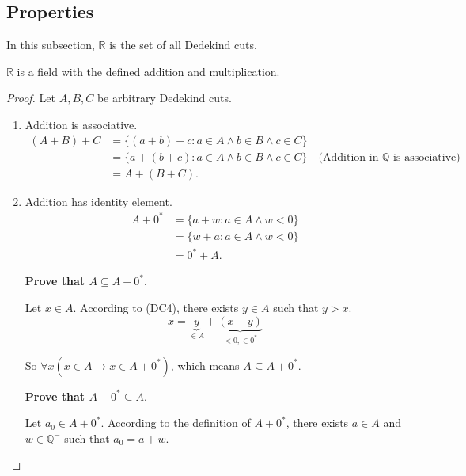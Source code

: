 \subsection*{Properties}

\par In this subsection, $\mathbb{R}$ is the set of all Dedekind cuts.

\begin{theorem}
    $\mathbb{R}$ is a field with the defined addition and multiplication.
\end{theorem}

\begin{proof}
    \par Let $A, B, C$ be arbitrary Dedekind cuts.
    \begin{enumerate}[label = (F\arabic*)]
        \item Addition is associative.
            \begin{align*}
                (A + B) + C & = \{ (a + b) + c : a\in A\land b\in B\land c\in C \} \\
                            & = \{ a + (b + c) : a\in A\land b\in B\land c\in C \} \quad\text{(Addition in $\mathbb{Q}$ is associative)} \\
                            & = A + (B + C).
            \end{align*}
        \item Addition has identity element.
            \begin{align*}
                A + {0}^{*} & = \{ a + w : a\in A\land w < 0 \} \\
                            & = \{ w + a : a\in A\land w < 0 \} \\
                            & = {0}^{*} + A.
            \end{align*}
            \par \textbf{Prove that $A \subseteq A + {0}^{*}$}.
            \par Let $x\in A$. According to (DC4), there exists $y\in A$ such that $y > x$.
            \[
                x = \underbrace{y}_{\in A} + \underbrace{(x - y)}_{< 0, \in {0}^{*}}
            \]
            \par So $\forall x(x\in A \rightarrow x\in A + {0}^{*})$, which means $A \subseteq A + {0}^{*}$.
            \bigskip
            \par \textbf{Prove that $A + {0}^{*} \subseteq A$}.
            \par Let $a_{0}\in A + {0^{*}}$. According to the definition of $A + {0}^{*}$, there exists $a\in A$ and $w\in\mathbb{Q}^{-}$ such that $a_{0} = a + w$.

\end{enumerate}
\end{proof}
